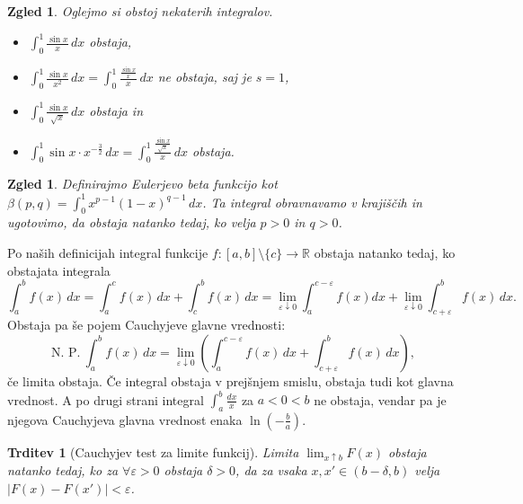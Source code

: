 \documentclass[10pt, a4paper]{article}
\newtheorem{trditev}[izr]{Trditev}
\newtheorem{zgled}[izr]{Zgled}
\newcommand{\R}{\mathbb {R}}
\newcommand{\rlimf}[3]{\lim_{#1 \downarrow #2} {#3}}
\newcommand{\llimf}[3]{\lim_{#1 \uparrow #2} {#3}}
\begin{document}
\begin{zgled}
    Oglejmo si obstoj nekaterih integralov.
    \begin{itemize}
        \item $\int_0 ^1 \frac{\sin x}{x}\,dx$ obstaja,
        \item $\int_0 ^1 \frac{\sin x}{x^2}\,dx = \int_0 ^1 \frac{\frac{\sin x}{x}}{x}\,dx$ ne obstaja, saj je $s = 1$,
        \item $\int_0 ^1 \frac{\sin x}{\sqrt{x}}\,dx$ obstaja in
        \item $\int_0 ^1 \sin x \cdot x^{-\frac{3}{2}}\,dx = \int_0 ^1 \frac{\frac{\sin x}{\sqrt{x}}}{x}\,dx$ obstaja.
    \end{itemize}
\end{zgled}

\begin{zgled}
    Definirajmo Eulerjevo beta funkcijo kot $\beta(p, q) = \int_0 ^1 x^{p-1} (1-x)^{q-1}\,dx$.
    Ta integral obravnavamo v krajiščih in ugotovimo, da obstaja natanko tedaj, ko velja $p > 0$ in $q > 0$.
\end{zgled}

Po naših definicijah integral funkcije $f: [a, b] \setminus \{c\} \rightarrow \R$ obstaja natanko tedaj, ko obstajata integrala 
$$\int_a ^b f(x)\,dx = \int_a ^c f(x)\,dx + \int_c ^b f(x)\,dx = \rlimf{\varepsilon}{0}{\int_a ^{c-\varepsilon} f(x)dx} + \rlimf{\varepsilon}{0}{\int_{c+\varepsilon} ^b f(x)}\,dx.$$
Obstaja pa še pojem Cauchyjeve glavne vrednosti:
$$\text{N. P.}\ \int_a ^b f(x)\,dx = \rlimf{\varepsilon}{0}{\left( \int_a ^{c-\varepsilon} f(x)\,dx + \int_{c + \varepsilon} ^b f(x)\,dx \right)},$$
če limita obstaja.
Če integral obstaja v prejšnjem smislu, obstaja tudi kot glavna vrednost. A po drugi strani integral 
$\int_a ^b \frac{dx}{x}$ za $a < 0 < b$ ne obstaja, vendar pa je njegova Cauchyjeva glavna vrednost enaka $\ln \left(- \frac{b}{a} \right)$.

\begin{trditev}[Cauchyjev test za limite funkcij]
    Limita $\llimf{x}{b}{F(x)}$ obstaja natanko tedaj, ko za $\forall \varepsilon > 0$ obstaja $\delta > 0$, da za vsaka $x, x' \in (b - \delta, b)$ velja $|F(x) - F(x')| < \varepsilon$.
\end{trditev}
\end{document}
